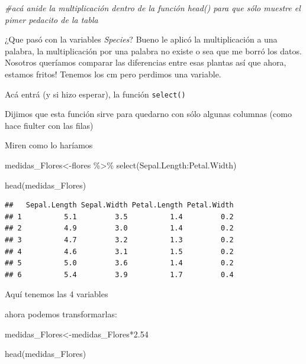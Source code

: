 \documentclass[
]{book}
\newenvironment{Shaded}{\begin{snugshade}}{\end{snugshade}}
\newcommand{\CommentTok}[1]{\textcolor[rgb]{0.56,0.35,0.01}{\textit{#1}}}
\newcommand{\FloatTok}[1]{\textcolor[rgb]{0.00,0.00,0.81}{#1}}
\newcommand{\FunctionTok}[1]{\textcolor[rgb]{0.00,0.00,0.00}{#1}}
\newcommand{\NormalTok}[1]{#1}
\newcommand{\OtherTok}[1]{\textcolor[rgb]{0.56,0.35,0.01}{#1}}
\newcommand{\SpecialCharTok}[1]{\textcolor[rgb]{0.00,0.00,0.00}{#1}}
\begin{document}
\begin{Shaded}
\begin{Highlighting}[]
\CommentTok{\#acá anide la multiplicación dentro de la función head() para que sólo muestre el pimer pedacito de la tabla}
\end{Highlighting}
\end{Shaded}

¿Que pasó con la variables \emph{Species}? Bueno le aplicó la multiplicación a una palabra, la multiplicación por una palabra no existe o sea que me borró los datos.
Nosotros queríamos comparar las diferencias entre esas plantas así que ahora, estamos fritos! Tenemos los cm pero perdimos una variable.

Acá entrá (y si hizo esperar), la función \texttt{select()}

Dijimos que esta función sirve para quedarno con sólo algunas columnas (como hace fiulter con las filas)

Miren como lo haríamos

\begin{Shaded}
\begin{Highlighting}[]
\NormalTok{medidas\_Flores}\OtherTok{\textless{}{-}}\NormalTok{flores }\SpecialCharTok{\%\textgreater{}\%} \FunctionTok{select}\NormalTok{(Sepal.Length}\SpecialCharTok{:}\NormalTok{Petal.Width)}

\FunctionTok{head}\NormalTok{(medidas\_Flores)}
\end{Highlighting}
\end{Shaded}

\begin{verbatim}
##   Sepal.Length Sepal.Width Petal.Length Petal.Width
## 1          5.1         3.5          1.4         0.2
## 2          4.9         3.0          1.4         0.2
## 3          4.7         3.2          1.3         0.2
## 4          4.6         3.1          1.5         0.2
## 5          5.0         3.6          1.4         0.2
## 6          5.4         3.9          1.7         0.4
\end{verbatim}

Aquí tenemos las 4 variables

ahora podemos transformarlas:

\begin{Shaded}
\begin{Highlighting}[]
\NormalTok{medidas\_Flores}\OtherTok{\textless{}{-}}\NormalTok{medidas\_Flores}\SpecialCharTok{*}\FloatTok{2.54}

\FunctionTok{head}\NormalTok{(medidas\_Flores)}
\end{Highlighting}
\end{Shaded}
\end{document}
